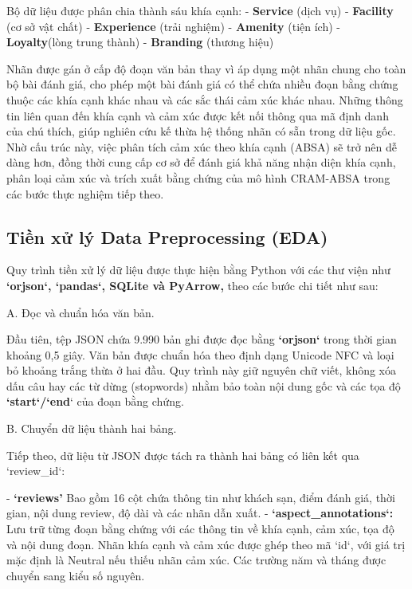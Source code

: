 \documentclass[pdflatex,sn-mathphys-num]{sn-jnl}
\theoremstyle{thmstyleone}
\theoremstyle{thmstyletwo}
\theoremstyle{thmstylethree}
\begin{document}
Bộ dữ liệu được phân chia thành sáu khía cạnh: 
- \textbf{Service} (dịch vụ)
- \textbf{Facility} (cơ sở vật chất)
- \textbf{Experience} (trải nghiệm)
- \textbf{Amenity} (tiện ích)
- \textbf{Loyalty}(lòng trung thành)
- \textbf{Branding} (thương hiệu)

Nhãn được gán ở cấp độ đoạn văn bản thay vì áp dụng một nhãn chung cho toàn bộ bài đánh giá, cho phép một bài đánh giá có thể chứa nhiều đoạn bằng chứng thuộc các khía cạnh khác nhau và các sắc thái cảm xúc khác nhau. Những thông tin liên quan đến khía cạnh và cảm xúc được kết nối thông qua mã định danh của chú thích, giúp nghiên cứu kế thừa hệ thống nhãn có sẵn trong dữ liệu gốc. Nhờ cấu trúc này, việc phân tích cảm xúc theo khía cạnh (ABSA) sẽ trở nên dễ dàng hơn, đồng thời cung cấp cơ sở để đánh giá khả năng nhận diện khía cạnh, phân loại cảm xúc và trích xuất bằng chứng của mô hình CRAM-ABSA trong các bước thực nghiệm tiếp theo.


\subsection{Tiền xử lý \- Data Preprocessing (EDA)}
\label{subsec:datapreprocessing}

Quy trình tiền xử lý dữ liệu được thực hiện bằng Python với các thư viện như \textbf{`orjson`, `pandas`, SQLite và PyArrow,} theo các bước chi tiết như sau:

A. Đọc và chuẩn hóa văn bản.

Đầu tiên, tệp JSON chứa 9.990 bản ghi được đọc bằng \textbf{`orjson`} trong thời gian khoảng 0,5 giây. Văn bản được chuẩn hóa theo định dạng Unicode NFC và loại bỏ khoảng trắng thừa ở hai đầu. Quy trình này giữ nguyên chữ viết, không xóa dấu câu hay các từ dừng (stopwords) nhằm bảo toàn nội dung gốc và các tọa độ \textbf{`start`/`end}` của đoạn bằng chứng.

B. Chuyển dữ liệu thành hai bảng.

Tiếp theo, dữ liệu từ JSON được tách ra thành hai bảng có liên kết qua `review\_id`:

- \textbf{`reviews'} Bao gồm 16 cột chứa thông tin như khách sạn, điểm đánh giá, thời gian, nội dung review, độ dài và các nhãn dẫn xuất.
- \textbf{`aspect\_annotations`:} Lưu trữ từng đoạn bằng chứng với các thông tin về khía cạnh, cảm xúc, tọa độ và nội dung đoạn. Nhãn khía cạnh và cảm xúc được ghép theo mã `id`, với giá trị mặc định là Neutral nếu thiếu nhãn cảm xúc. Các trường năm và tháng được chuyển sang kiểu số nguyên.
\end{document}
